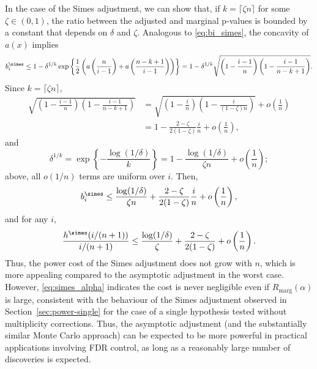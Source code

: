 In the case of the Simes adjustment, we can show that, if $k = \lceil \zeta n\rceil$ for some $\zeta \in (0, 1)$, the ratio between the adjusted and marginal p-values is bounded by a constant that depends on $\delta$ and $\zeta$. Analogous to \eqref{eq:bi_simes}, the concavity of $a(x)$ implies
\[b_{i}^{\simes} \le 1 - \delta^{1/k}\exp\left\{\frac{1}{2}\left( a\left(\frac{n}{i - 1}\right) +a\left(\frac{n-k+1}{i - 1}\right) \right)\right\} = 1 - \delta^{1/k}\sqrt{\left(1 - \frac{i-1}{n}\right)\left(1 - \frac{i-1}{n-k+1}\right)}.\]
Since $k = \lceil\zeta n\rceil$,
\begin{align*}
\sqrt{\left(1 - \frac{i-1}{n}\right)\left(1 - \frac{i-1}{n-k+1}\right)} &= \sqrt{\left(1 - \frac{i}{n}\right)\left(1 - \frac{i}{(1-\zeta)n}\right)} + o\left(\frac{1}{n}\right)\\
& = 1 - \frac{2-\zeta}{2(1 - \zeta)}\frac{i}{n} + o\left(\frac{1}{n}\right),
\end{align*}
and
\[\delta^{1/k} = \exp\left\{-\frac{\log(1/\delta)}{k}\right\} = 1 - \frac{\log(1/\delta)}{\zeta n} + o\left(\frac{1}{n}\right);\]
above, all $o(1/n)$ terms are uniform over $i$.
Then,
\[b_{i}^\simes \le \frac{\log(1/\delta)}{\zeta n}
 + \frac{2-\zeta}{2(1 - \zeta)}\frac{i}{n}
 + o\left(\frac{1}{n}\right),\]
 and for any $i$,
 \[\frac{h^\simes(i / (n + 1))}{i / (n + 1)} \le \frac{\log(1/\delta)}{\zeta}
 + \frac{2-\zeta}{2(1 - \zeta)} + o\left(\frac{1}{n}\right).\]
Thus, the power cost of the Simes adjustment does not grow with $n$, which is more appealing compared to the asymptotic adjustment in the worst case. However, \eqref{eq:simes_alpha} indicates the cost is never negligible even if $R_{\mathrm{marg}}(\alpha)$ is large, consistent with the behaviour of the Simes adjustment observed in Section~\ref{sec:power-single} for the case of a single hypothesis tested without multiplicity corrections. Thus, the asymptotic adjustment (and the substantially similar Monte Carlo approach) can be expected to be more powerful in practical applications involving FDR control, as long as a reasonably large number of discoveries is expected.


